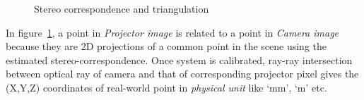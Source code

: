 \begin{figure}[!h]
\centering
{}
\caption{Stereo correspondence and triangulation}
\label{fig:correspond_triangulate}
\end{figure}
\FloatBarrier
In figure~\ref{fig:correspond_triangulate}, a point in \textit{Projector image} is related to a point in \textit{Camera image} because they are 2D projections of a common point in the scene using the estimated stereo-correspondence. Once system is calibrated, ray-ray intersection between optical ray of camera and that of corresponding projector pixel gives the (X,Y,Z) coordinates of real-world point in \textit{physical unit} like `mm', `m' etc. \newline

